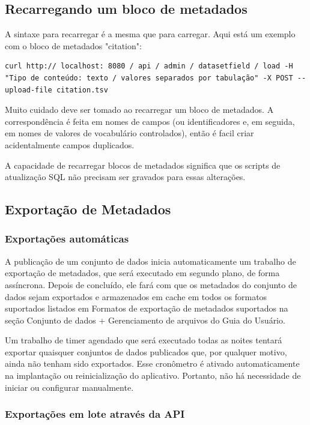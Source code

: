 \documentclass[12pt,hidelinks]{article}
\begin{document}
\subsection{Recarregando um bloco de metadados}

\qquad A sintaxe para recarregar é a mesma que para carregar. Aqui está um exemplo com o bloco de metadados "citation":\\
\begin{verbatim}
curl http:// localhost: 8080 / api / admin / datasetfield / load -H "Tipo de conteúdo: texto / valores separados por tabulação" -X POST --upload-file citation.tsv
\end{verbatim}
Muito cuidado deve ser tomado ao recarregar um bloco de metadados. A correspondência é feita em nomes de campos (ou identificadores e, em seguida, em nomes de valores de vocabulário controlados), então é  facil criar acidentalmente campos duplicados.

A capacidade de recarregar blocos de metadados significa que os scripts de atualização SQL não precisam ser gravados para essas alterações.
        
\subsection{Exportação de Metadados}

\subsubsection{Exportações automáticas}

\qquad A publicação de um conjunto de dados inicia automaticamente um trabalho de exportação de metadados, que será executado em segundo plano, de forma assíncrona. Depois de concluído, ele fará com que os metadados do conjunto de dados sejam exportados e armazenados em cache em todos os formatos suportados listados em Formatos de exportação de metadados suportados na seção Conjunto de dados + Gerenciamento de arquivos do Guia do Usuário.

Um trabalho de timer agendado que será executado todas as noites tentará exportar quaisquer conjuntos de dados publicados que, por qualquer motivo, ainda não tenham sido exportados. Esse cronômetro é ativado automaticamente na implantação ou reinicialização do aplicativo. Portanto, não há necessidade de iniciar ou configurar manualmente.

\subsubsection{Exportações em lote através da API}
\end{document}
